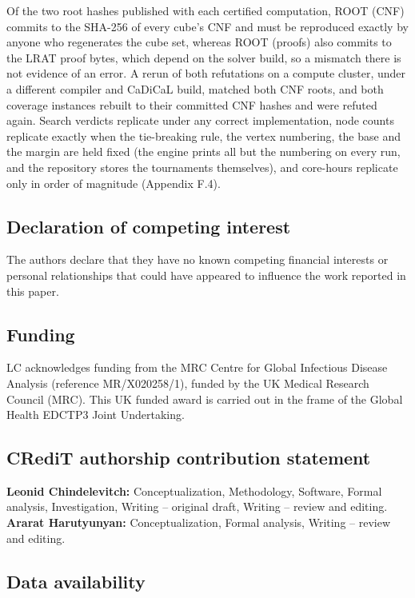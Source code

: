 \documentclass[
]{article}
\begin{document}
Of the two root hashes published with each certified computation, ROOT
(CNF) commits to the SHA-256 of every cube's CNF and must be reproduced
exactly by anyone who regenerates the cube set, whereas ROOT (proofs)
also commits to the LRAT proof bytes, which depend on the solver build,
so a mismatch there is not evidence of an error. A rerun of both
refutations on a compute cluster, under a different compiler and CaDiCaL
build, matched both CNF roots, and both coverage instances rebuilt to
their committed CNF hashes and were refuted again. Search verdicts
replicate under any correct implementation, node counts replicate
exactly when the tie-breaking rule, the vertex numbering, the base and
the margin are held fixed (the engine prints all but the numbering on
every run, and the repository stores the tournaments themselves), and
core-hours replicate only in order of magnitude (Appendix F.4).

\subsection{Declaration of competing
interest}\label{declaration-of-competing-interest}

The authors declare that they have no known competing financial
interests or personal relationships that could have appeared to
influence the work reported in this paper.

\subsection{Funding}\label{funding}

LC acknowledges funding from the MRC Centre for Global Infectious
Disease Analysis (reference MR/X020258/1), funded by the UK Medical
Research Council (MRC). This UK funded award is carried out in the frame
of the Global Health EDCTP3 Joint Undertaking.

\subsection{CRediT authorship contribution
statement}\label{credit-authorship-contribution-statement}

\textbf{Leonid Chindelevitch:} Conceptualization, Methodology, Software,
Formal analysis, Investigation, Writing -- original draft, Writing --
review and editing. \textbf{Ararat Harutyunyan:} Conceptualization,
Formal analysis, Writing -- review and editing.

\subsection{Data availability}\label{data-availability}
\end{document}
